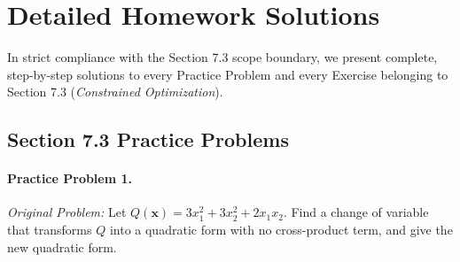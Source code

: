 \documentclass[11pt, letterpaper]{article}
\theoremstyle{definition}
\theoremstyle{remark}
\begin{document}
\section{Detailed Homework Solutions}

In strict compliance with the Section 7.3 scope boundary, we present complete, step-by-step solutions to every Practice Problem and every Exercise belonging to Section 7.3 (\emph{Constrained Optimization}).

\subsection{Section 7.3 Practice Problems}

\paragraph{Practice Problem 1.}
\emph{Original Problem:} Let $Q(\mathbf{x}) = 3x_1^2 + 3x_2^2 + 2x_1 x_2$. Find a change of variable that transforms $Q$ into a quadratic form with no cross-product term, and give the new quadratic form.
\end{document}
